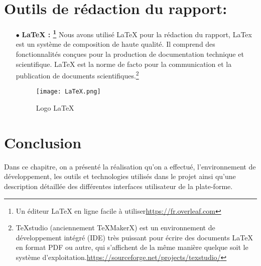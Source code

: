 \section{Outils de rédaction du rapport:}
\begin{itemize}

	\item[$\bullet$] \textbf{ LaTeX : \footnote{ Un éditeur LaTeX en ligne facile à utiliser\url{https://fr.overleaf.com} }} 
Nous avons utilisé LaTeX pour la rédaction du rapport, LaTex est un système de composition
de haute qualité. Il comprend des fonctionnalités conçues pour la production de documentation
technique et scientifique. LaTeX est la norme de facto pour la communication et la publication de
documents scientifiques.\footnote{ TeXstudio (anciennement TeXMakerX) est un environnement de développement intégré (IDE) très puissant pour écrire des documents LaTeX en format PDF ou autre, qui s’affichent de la même manière quelque soit le système d’exploitation.\url{https://sourceforge.net/projects/texstudio/} }\cite{wiki:PHP}
\begin{figure}[ht]
	\centering
	\texttt{[image: LaTeX.png]}
	\caption{Logo LaTeX}
	\label{fig:LaTeX }
\end{figure}
\FloatBarrier

\medskip


\end{itemize}

















\clearpage





 


\section{Conclusion}
Dans ce chapitre, on a présenté la réalisation qu'on a effectué, l’environnement de développement, les outils et technologies utilisés dans le projet ainsi qu'une description détaillée des différentes interfaces utilisateur de la plate-forme.


